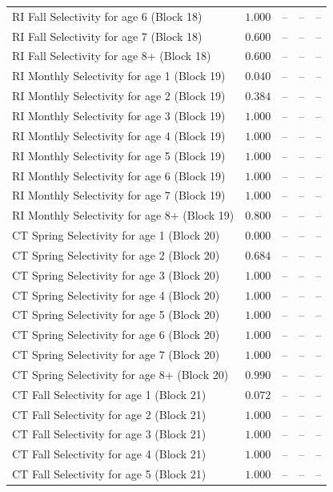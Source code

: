 \documentclass[
]{article}
\begin{document}
\begin{landscape}
\begin{longtable}[t]{lrrrr}
RI Fall Selectivity for age 6 (Block 18) & $1.000$ & -- & -- & --\\
RI Fall Selectivity for age 7 (Block 18) & $0.600$ & -- & -- & --\\
RI Fall Selectivity for age 8+ (Block 18) & $0.600$ & -- & -- & --\\
\addlinespace
RI Monthly Selectivity for age 1 (Block 19) & $0.040$ & -- & -- & --\\
RI Monthly Selectivity for age 2 (Block 19) & $0.384$ & -- & -- & --\\
RI Monthly Selectivity for age 3 (Block 19) & $1.000$ & -- & -- & --\\
RI Monthly Selectivity for age 4 (Block 19) & $1.000$ & -- & -- & --\\
RI Monthly Selectivity for age 5 (Block 19) & $1.000$ & -- & -- & --\\
\addlinespace
RI Monthly Selectivity for age 6 (Block 19) & $1.000$ & -- & -- & --\\
RI Monthly Selectivity for age 7 (Block 19) & $1.000$ & -- & -- & --\\
RI Monthly Selectivity for age 8+ (Block 19) & $0.800$ & -- & -- & --\\
CT Spring Selectivity for age 1 (Block 20) & $0.000$ & -- & -- & --\\
CT Spring Selectivity for age 2 (Block 20) & $0.684$ & -- & -- & --\\
\addlinespace
CT Spring Selectivity for age 3 (Block 20) & $1.000$ & -- & -- & --\\
CT Spring Selectivity for age 4 (Block 20) & $1.000$ & -- & -- & --\\
CT Spring Selectivity for age 5 (Block 20) & $1.000$ & -- & -- & --\\
CT Spring Selectivity for age 6 (Block 20) & $1.000$ & -- & -- & --\\
CT Spring Selectivity for age 7 (Block 20) & $1.000$ & -- & -- & --\\
\addlinespace
CT Spring Selectivity for age 8+ (Block 20) & $0.990$ & -- & -- & --\\
CT Fall Selectivity for age 1 (Block 21) & $0.072$ & -- & -- & --\\
CT Fall Selectivity for age 2 (Block 21) & $1.000$ & -- & -- & --\\
CT Fall Selectivity for age 3 (Block 21) & $1.000$ & -- & -- & --\\
CT Fall Selectivity for age 4 (Block 21) & $1.000$ & -- & -- & --\\
\addlinespace
CT Fall Selectivity for age 5 (Block 21) & $1.000$ & -- & -- & --\\

\end{longtable}
\end{landscape}
\end{document}

